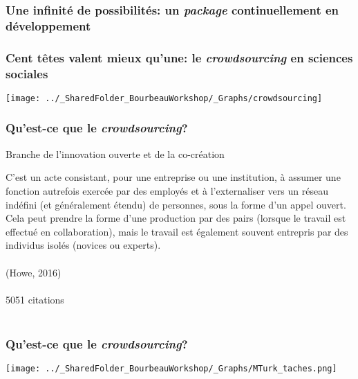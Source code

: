 \documentclass{beamer}
\begin{document}


    \begin{frame}
    
        \frametitle{Une infinité de possibilités: un \emph{package} continuellement en développement} \vspace{1cm}
    
    \end{frame}
    
    
    
     \begin{frame}
	        \frametitle{Cent têtes valent mieux qu’une: le \emph{crowdsourcing} en sciences sociales} \vspace{1cm}   
	        \begin{center}
	           \texttt{[image: ../\_SharedFolder\_BourbeauWorkshop/\_Graphs/crowdsourcing]}
	        \end{center}  
	    \end{frame}
    
   


    \begin{frame}
    
      \frametitle{Qu’est-ce que le \emph{crowdsourcing}?} \vspace{1cm}
      
    Branche de l’innovation ouverte et de la co-création
    
    \begin{center}
		C'est un acte consistant, pour une entreprise ou une institution, à assumer une fonction autrefois exercée par des employés et à l'externaliser vers un réseau indéfini (et généralement étendu) de personnes, sous la forme d'un appel ouvert. Cela peut prendre la forme d'une production par des pairs (lorsque le travail est effectué en collaboration), mais le travail est également souvent entrepris par des individus isolés (novices ou experts). \\~\\
		(Howe, 2016)  \\~\\
		5051 citations \\~\\
    \end{center}
         
    \end{frame}  
    
    

    \begin{frame}
    
      \frametitle{Qu’est-ce que le \emph{crowdsourcing}?} \vspace{1cm}
      
       \begin{center}
         \texttt{[image: ../\_SharedFolder\_BourbeauWorkshop/\_Graphs/MTurk\_taches.png]}
        \end{center} 
   
         
    \end{frame}  
    
\end{document}
